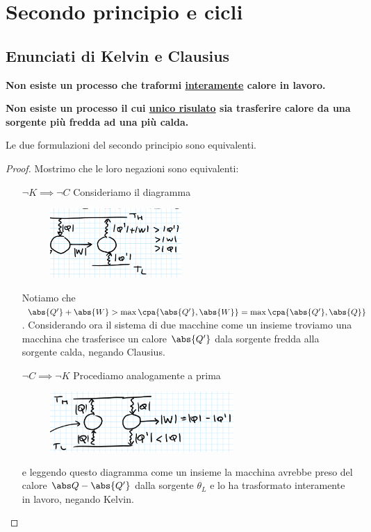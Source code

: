 \chapter{Secondo principio e cicli}

\section{Enunciati di Kelvin e Clausius}
\begin{fact}
\textbf{Non esiste un processo che traformi \ul{interamente} calore in lavoro.}
\end{fact}

\begin{fact}
\textbf{Non esiste un processo il cui \ul{unico risulato} sia trasferire calore da una sorgente pi\`u fredda ad una pi\`u calda.}
\end{fact}

\begin{proposition}
Le due formulazioni del secondo principio sono equivalenti.
\end{proposition}
\begin{proof}
Mostrimo che le loro negazioni sono equivalenti:
\setlength{\leftmargini}{0cm}
\begin{itemize}
\item[$\boxed{\neg K\implies \neg C}$] Consideriamo il diagramma
\begin{figure}[!htb]
    \centering
    \includegraphics[width=5cm]{images/NonKelvin_Implica_NonClausius.png}
\end{figure}

Notiamo che $\abs{Q'}+\abs{W}>\max{\cpa{\abs{Q'},\abs{W}}}=\max{\cpa{\abs{Q'},\abs{Q}}}$. Considerando ora il sistema di due macchine come un insieme troviamo una macchina che trasferisce un calore $\abs{Q'}$ dala sorgente fredda alla sorgente calda, negando Clausius.
\item[$\boxed{\neg C\implies \neg K}$] Procediamo analogamente a prima
\begin{figure}[!htb]
    \centering
    \includegraphics[width=7cm]{images/NonClausius_Implica_NonKelvin.png}
\end{figure}

e leggendo questo diagramma come un insieme la macchina avrebbe preso del calore $\abs Q-\abs{Q'}$ dalla sorgente $\theta_L$ e lo ha trasformato interamente in lavoro, negando Kelvin.
\end{itemize}
\setlength{\leftmargini}{0.5cm}
\end{proof}



